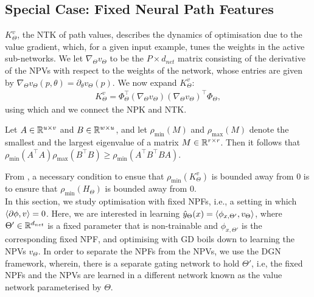 \subsection{Special Case: Fixed Neural Path Features}
 $K^v_{\Theta}$, the NTK of path values, describes the dynamics of optimisation due to the value gradient, which, for a given input example, tunes the weights in the active sub-networks. We let $\nabla_{\Theta}v_{\Theta}$ to be the $P\times d_{net}$ matrix consisting of the derivative of the NPVs with respect to the weights of the network, whose entries are given by $\nabla_{\Theta}v_{\Theta}(p,\theta)=\partial_{\theta}v_{\Theta}(p)$. We now expand $K^v_{\Theta}$:
\begin{align}\label{eq:kv}
K^{v}_{\Theta}=\Phi^\top_{\Theta}(\nabla_{\Theta} v_{\Theta})(\nabla_{\Theta} v_{\Theta})^\top \Phi_{\Theta},
\end{align}
using which and  we connect the NPK and NTK.
\begin{lemma}\label{lm:nec}
Let $A\in\mathbb{R}^{u\times v}$ and $B\in\mathbb{R}^{w\times u}$, and let $\rho_{\min}(M)$ and $\rho_{\max}(M)$ denote the smallest and the largest eigenvalue of a matrix $M\in\mathbb{R}^{r\times r}$. Then it follows that $\rho_{\min}(A^\top A)\rho_{\max}(B^\top B)\geq \rho_{\min}(A^\top B^\top BA)$.
\end{lemma}
From , a necessary condition to ensue that $\rho_{\min}(K^v_{\Theta})$ is bounded away from $0$ is to ensure that $\rho_{\min}(H_{\Theta})$ is bounded away from $0$.\\
In this section, we study optimisation with fixed NPFs, i.e., a setting in which $\langle \partial \phi,v\rangle=0$. Here, we are interested in learning $\hat{y}_{\Theta}(x)=\langle \phi_{x,\Theta'}, v_{\Theta}\rangle$, where $\Theta'\in\mathbb{R}^{d_{net}}$ is a fixed parameter that is non-trainable and $\phi_{x,\Theta'}$ is the corresponding fixed NPF, and optimising with GD boils down to learning the NPVs $v_{\Theta}$. In order to separate the NPFs from the NPVs, we use the DGN framework, wherein, there is a separate gating network to hold $\Theta'$, i.e, the fixed NPFs and the NPVs are learned in a different network known as the value network parameterised by $\Theta$. %
